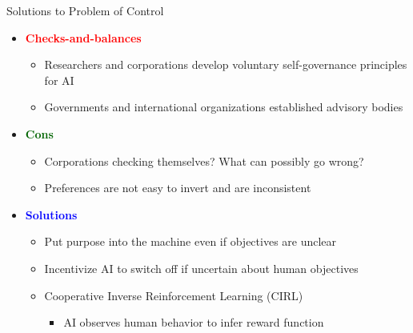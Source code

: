 \documentclass[
  10pt,
  ignorenonframetext,
]{beamer}
\providecommand{\tightlist}{%
  \setlength{\itemsep}{0pt}\setlength{\parskip}{0pt}}
\begin{document}
\begin{frame}{Solutions to Problem of Control}
\label{solutions-to-problem-of-control}
\begin{itemize}
\tightlist
\item
  \textbf{\textcolor{red}{Checks-and-balances}}

  \begin{itemize}
  \tightlist
  \item
    Researchers and corporations develop voluntary self-governance
    principles for AI
  \item
    Governments and international organizations established advisory
    bodies
  \end{itemize}
\item
  \textbf{\textcolor{darkgreen}{Cons}}

  \begin{itemize}
  \tightlist
  \item
    Corporations checking themselves? What can possibly go wrong?
  \item
    Preferences are not easy to invert and are inconsistent
  \end{itemize}
\item
  \textbf{\textcolor{blue}{Solutions}}

  \begin{itemize}
  \tightlist
  \item
    Put purpose into the machine even if objectives are unclear
  \item
    Incentivize AI to switch off if uncertain about human objectives
  \item
    Cooperative Inverse Reinforcement Learning (CIRL)

    \begin{itemize}
    \tightlist
    \item
      AI observes human behavior to infer reward function
    \end{itemize}
  \end{itemize}
\end{itemize}
\end{frame}
\end{document}
